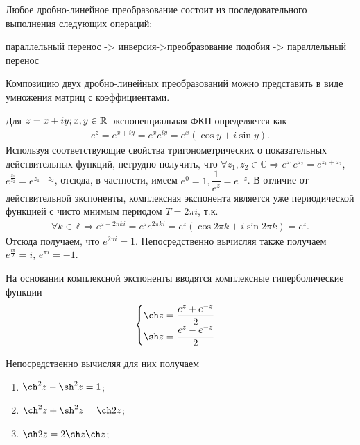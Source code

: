 \begin{plan}
\item Любое дробно-линейное преобразование состоит из последовательного выполнения следующих
  операций:

  параллельный перенос -> инверсия->преобразование подобия -> параллельный перенос
\item Композицию двух дробно-линейных преобразований можно представить в виде умножения матриц с
  коэффициентами.
\end{plan}

\begin{col-answer-preambule}
\end{col-answer-preambule}
Для $z = x + iy; x, y \in \mathbb{R}^{}$ экспоненциальная ФКП определяется как
\begin{align*}
  e^z = e^{x + iy} = e^xe^{iy} = e^x(\cos y + i\sin y).
\end{align*}
Используя соответствующие свойства тригонометрических о показательных действительных функций,
нетрудно получить, что ${\forall z_1, z_2 \in \mathbb{C} \Rightarrow e^{z_1}e^{z_2} = e^{z_1 + z_2}}$,
${e^{\frac{z_1}{z_2}} = e^{z_1 - z_2}}$, отсюда, в частности, имеем $e^0 = 1, \dfrac{1}{e^z} = e^{-z}$.
В отличие от действительной экспоненты, комплексная экспонента является уже периодической
функцией с чисто мнимым периодом $T = 2\pi i$, т.к.
\begin{align*}
  \forall k \in \mathbb{Z} \Rightarrow e^{z + 2\pi k i} = e^ze^{2\pi ki} = e^z(\cos 2\pi k +
  i\sin 2 \pi k) = e^z.
\end{align*}
Отсюда получаем, что $e^{2\pi i} = 1$. Непосредственно вычисляя также получаем $e^{\frac{i\pi}{2}} = i$,
$e^{\pi i} = -1$.

На основании комплексной экспоненты вводятся комплексные гиперболические функции
\begin{align*}
  \begin{cases}
    \ch z = \dfrac{e^z + e^{-z}}{2}\\
    \sh z = \dfrac{e^z - e^{-z}}{2}\\
  \end{cases}
\end{align*}

Непосредственно вычисляя для них получаем
\begin{enumerate}
\item $\ch^2 z - \sh^2z = 1$;
\item $\ch^2 z + \sh^2z = \ch 2z$;
\item $\sh 2z = 2\sh z\ch z$;
\end{enumerate}

